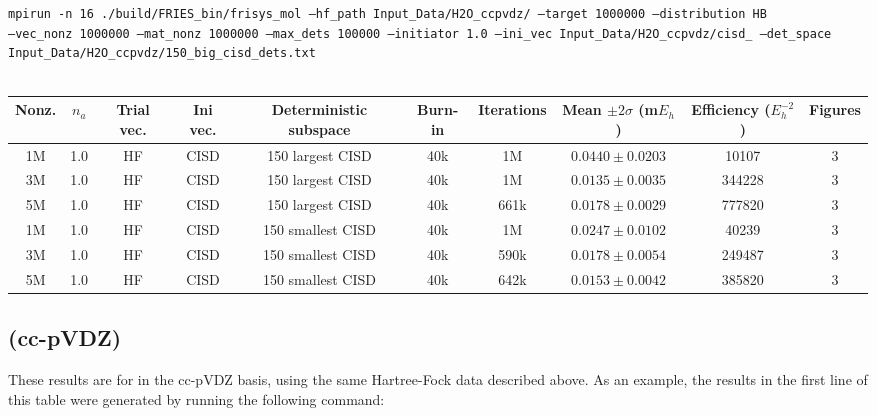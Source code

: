 \documentclass[12pt, landscape]{article}
\begin{document}
\texttt{mpirun -n 16 ./build/FRIES\_bin/frisys\_mol --hf\_path Input\_Data/H2O\_ccpvdz/ --target 1000000 --distribution HB}\\ \texttt{--vec\_nonz 1000000 --mat\_nonz 1000000 --max\_dets 100000 --initiator 1.0 --ini\_vec Input\_Data/H2O\_ccpvdz/cisd\_ --det\_space Input\_Data/H2O\_ccpvdz/150\_big\_cisd\_dets.txt}
\\~\\
\begin{tabular}{c|c|c|c|c|c|c|c|c|c}
Nonz. & $n_a$ & Trial vec. & Ini vec. & Deterministic subspace & Burn-in & Iterations & Mean $\pm 2 \sigma$ (m$E_h$) & Efficiency ($E_h^{-2}$) & Figures \\ \hline
1M & 1.0 & HF & CISD & 150 largest CISD & 40k & 1M & $0.0440 \pm 0.0203$ & 10107 & 3 \\
3M & 1.0 & HF & CISD & 150 largest CISD & 40k & 1M & $0.0135 \pm 0.0035$ & 344228 & 3 \\
5M & 1.0 & HF & CISD & 150 largest CISD & 40k & 661k & $0.0178 \pm 0.0029$ & 777820 & 3 \\
1M & 1.0 & HF & CISD & 150 smallest CISD & 40k & 1M & $0.0247 \pm 0.0102$ & 40239 & 3 \\
3M & 1.0 & HF & CISD & 150 smallest CISD & 40k & 590k & $0.0178 \pm 0.0054$ & 249487 & 3 \\
5M & 1.0 & HF & CISD & 150 smallest CISD & 40k & 642k & $0.0153 \pm 0.0042$ & 385820 & 3 \\
\end{tabular}


\subsection*{ (cc-pVDZ)}
These results are for  in the cc-pVDZ basis, using the same Hartree-Fock data described above. As an example, the results in the first line of this table were generated by running the following command:
\end{document}
